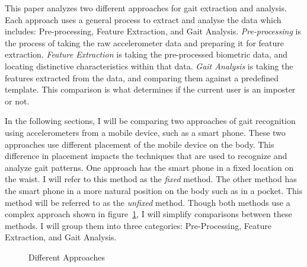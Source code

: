 \documentclass{sig-alternate}
\begin{document}
	
	  
	 
	 
	
	This paper analyzes two different approaches for gait extraction and analysis. Each approach uses a general process to extract and analyse the data which includes: Pre-processing, Feature Extraction, and Gait Analysis. \textit{Pre-processing} is the process of taking the raw accelerometer data and preparing it for feature extraction. \textit{Feature Extraction} is taking the pre-processed biometric data, and locating distinctive characteristics within that data. \textit{Gait Analysis} is taking the features extracted from the data, and comparing them against a predefined template. This comparison is what determines if the current user is an imposter or not.

	In the following sections, I will be comparing two approaches of gait recognition using accelerometers from a mobile device, such as a smart phone. These two approaches use different placement of the mobile device on the body. This difference in placement impacts the techniques that are used to recognize and analyze gait patterns. One approach has the smart phone in a fixed location on the waist. I will refer to this method as the \textit{fixed} method. The other method has the smart phone in a more natural position on the body such as in a pocket. This method will be referred to as the \textit{unfixed} method. Though both methods use a complex approach shown in figure~\ref{fig:AlgorithmProcess}, I will simplify comparisons between these methods. I will group them into three categories: Pre-Processing, Feature Extraction, and Gait Analysis. 
	
\begin{figure}
\centering
{}
\caption{Different Approaches}
\label{fig:AlgorithmProcess}
\end{figure}	



\end{document}
